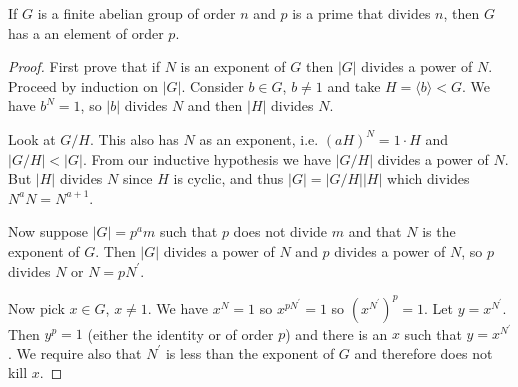 \begin{lemma}
If $G$ is a finite abelian group of order $n$ and $p$ is a prime that
divides $n$, then $G$ has a an element of order $p$.
\end{lemma}

\begin{proof}
First prove that if $N$ is an exponent of $G$ then $|G|$ divides a
power of $N$. Proceed by induction on $|G|$. Consider $b \in G$, $b
\neq 1$ and take $H = \langle b \rangle < G$. We have $b^N = 1$, so
$|b|$ divides $N$ and then $|H|$ divides $N$.

Look at $G / H$. This also has $N$ as an exponent, i.e.
$(aH)^N = 1 \cdot H$ and $|G / H| < |G|$. From our inductive
hypothesis we have $|G / H|$ divides a power of $N$. But
$|H|$ divides $N$ since $H$ is cyclic, and thus
$|G| = |G / H| |H|$ which divides $N^a N = N^{a+1}$.

Now suppose $|G| = p^a m$ such that $p$ does not divide $m$
and that $N$ is the exponent of $G$. Then $|G|$ divides a power of $N$
and $p$ divides a power of $N$, so $p$ divides $N$ or $N = p
N^\prime$.

Now pick $x \in G$, $x \neq 1$. We have $x^N = 1$ so $x^{pN^\prime} =
1$ so $(x^{N^\prime})^p = 1$. Let $y = x^{N^\prime}$. Then $y^p = 1$
(either the identity or of order $p$) and there is an $x$ such that
$y = x^{N^\prime}$. We require also that $N^\prime$ is less than the
exponent of $G$ and therefore does not kill $x$.
\end{proof}


